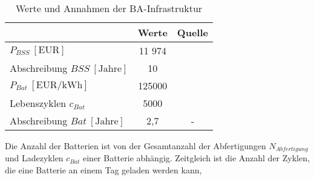 %
%
%
%
%
\begin{table}[h]
	\begin{center}
    \caption{Werte und Annahmen der BA-Infrastruktur}
	\label{BA_Infrastrukturtab}
	\begin{tabular}{|l|c|c|}
		\hline
		 & \textbf{Werte} & \textbf{Quelle} \\ \hline
		$P_{BSS} ~[\text{EUR}]$ &  11 974  & \cite{guo2020aviation} \\ \hline
      Abschreibung $BSS ~[\text{Jahre}]$&  10  & \cite{salucci2020optimal} \\ \hline
		$P_{Bat} ~[\text{EUR/kWh}]$ & 125000 & \cite{guo2020aviation} \\ \hline
      Lebenszyklen $c_{Bat}$ & 5000 & \cite{reimers2018introduction} \\ \hline
      Abschreibung $Bat ~[\text{Jahre}]$& 2,7 & -\\ \hline
	\end{tabular}
    \end{center}
\end{table}
Die Anzahl der Batterien ist von der Gesamtanzahl der Abfertigungen $N_{Abfertigung}$ 
und Ladezyklen $c_{Bat}$ einer Batterie abhängig. 
Zeitgleich ist die Anzahl der Zyklen, die eine Batterie an einem Tag geladen werden kann, 

